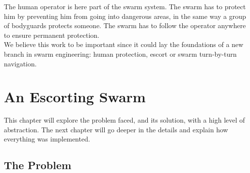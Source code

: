 \documentclass[oneside, a4paper, 12pt]{memoir}
\begin{document}
	The human operator is here part of the swarm system. The swarm has to protect him by preventing him from going into dangerous areas, in the same way a group of bodyguards protects someone. The swarm has to follow the operator anywhere to ensure permanent protection.\\
	
	We believe this work to be important since it could lay the foundations of a new branch in swarm engineering: human protection, escort or swarm turn-by-turn navigation.

\chapter{An Escorting Swarm}
\label{chap:escorting_swarm}

This chapter will explore the problem faced, and its solution, with a high level of abstraction. The next chapter will go deeper in the details and explain how everything was implemented.

	\section{The Problem}
	

	
\end{document}
